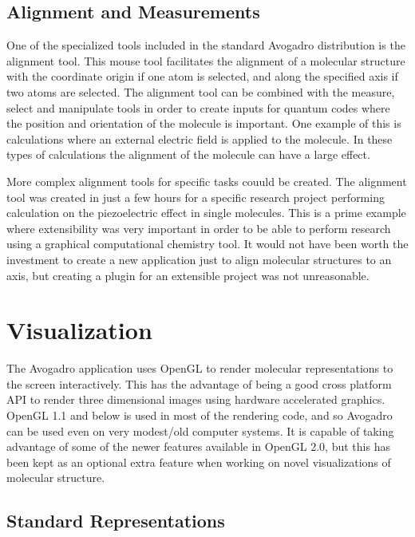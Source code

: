 \documentclass[10pt]{bmc_article}
\newenvironment{bmcformat}{\begin{raggedright}
\baselineskip20pt\sloppy\setboolean{publ}{false}}{\end{raggedright}
\baselineskip20pt\sloppy}
\begin{document}
\begin{bmcformat}
\subsection{Alignment and Measurements}

One of the specialized tools included in the standard Avogadro distribution is
the alignment tool. This mouse tool facilitates the alignment of a molecular
structure with the coordinate origin if one atom is selected, and along the
specified axis if two atoms are selected. The alignment tool can be combined
with the measure, select and manipulate tools in order to create inputs for
quantum codes where the position and orientation of the molecule is important.
One example of this is calculations where an external electric field is applied
to the molecule. In these types of calculations the alignment of the molecule
can have a large effect.

More complex alignment tools for specific tasks couuld be created. The alignment
tool was created in just a few hours for a specific research project performing
calculation on the piezoelectric effect in single molecules. This is a prime
example where extensibility was very important in order to be able to perform
research using a graphical computational chemistry tool. It would not have been
worth the investment to create a new application just to align molecular
structures to an axis, but creating a plugin for an extensible project was not
unreasonable.


\section{Visualization}

The Avogadro application uses OpenGL to render molecular representations to the
screen interactively. This has the advantage of being a good cross platform API
to render three dimensional images using hardware accelerated graphics. OpenGL
1.1 and below is used in most of the rendering code, and so Avogadro can be used
even on very modest/old computer systems. It is capable of taking advantage of
some of the newer features available in OpenGL 2.0, but this has been kept as an
optional extra feature when working on novel visualizations of molecular
structure.

\subsection{Standard Representations}


\end{bmcformat}
\end{document}
